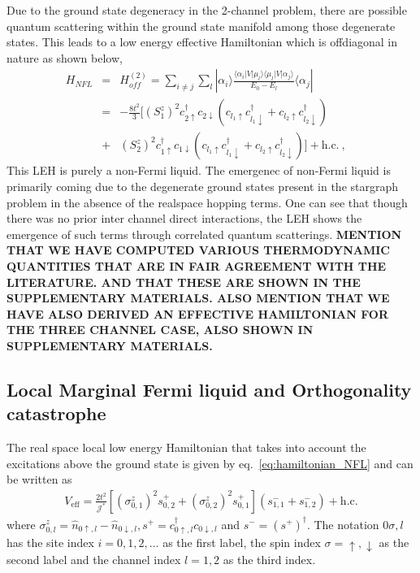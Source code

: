 \documentclass[reprint,prb,superscriptaddress]{revtex4-2}
\begin{document}
Due to the ground state degeneracy in the 2-channel problem, there are possible quantum scattering within the ground state manifold among those degenerate states. This leads to a low energy effective Hamiltonian which is offdiagonal in nature as shown below,
\begin{eqnarray}
H_{NFL}&=&H^{(2)}_{off} = \sum_{i\neq j} \sum_l |\alpha_i\rangle \frac{\langle \alpha_i  | V| \mu_l \rangle \langle \mu_l  | V| \alpha_j \rangle}{E_0-E_{l}}\langle \alpha_j | \nonumber\\
&=& -\frac{8t^2}{3} [ (S_1^z)^2 c_{2\uparrow}^{\dagger}c_{2\downarrow}  (  c_{l_1\uparrow}c_{l_1\downarrow}^{\dagger} +  c_{l_2\uparrow}c_{l_2\downarrow}^{\dagger}  ) \nonumber\\
&+& (S_2^z)^2 c_{1\uparrow}^{\dagger}c_{1\downarrow}  (  c_{l_1\uparrow}c_{l_1\downarrow}^{\dagger} +  c_{l_2\uparrow}c_{l_2\downarrow}^{\dagger}  ) ] + \textrm{h.c.} ~,~~~~
\label{eq:hamiltonian_NFL}
\end{eqnarray}
This LEH is purely a non-Fermi liquid. The emergenec of non-Fermi liquid is primarily coming due to the degenerate ground states present in the stargraph problem in the absence of the realspace hopping terms. One can see that though there was no prior inter channel direct interactions, the LEH shows the emergence of such terms through correlated quantum scatterings. \textbf{MENTION THAT WE HAVE COMPUTED VARIOUS THERMODYNAMIC QUANTITIES THAT ARE IN FAIR AGREEMENT WITH THE LITERATURE. AND THAT THESE ARE SHOWN IN THE SUPPLEMENTARY MATERIALS. ALSO MENTION THAT WE HAVE ALSO DERIVED AN EFFECTIVE HAMILTONIAN FOR THE THREE CHANNEL CASE, ALSO SHOWN IN SUPPLEMENTARY MATERIALS.}


\subsection{Local Marginal Fermi liquid and Orthogonality catastrophe}
The real space local low energy Hamiltonian that takes into account the excitations above the ground state is given by eq.~\ref{eq:hamiltonian_NFL} and can be written as
\begin{equation}\begin{aligned}
	\label{nfl_terms}
	V_\text{eff} = \frac{2t^2}{{\mathcal{J}^*}}\left[\left(\sigma^z_{0,1}\right)^2 s^+_{0,2} + \left(\sigma^z_{0,2}\right)^2 s^+_{0,1}\right] \left(s^-_{1,1} + s^-_{1,2}\right) + \text{h.c.}
\end{aligned}\end{equation}
where \(\sigma^z_{0,l} = \hat n_{0\uparrow,l} - \hat n_{0\downarrow,l}, s^+ = c^\dagger_{0 \uparrow,l}c_{0 \downarrow,l}\) and \(s^- = \left(s^+\right)^\dagger\). The notation \(0\sigma,l\) has the site index \(i=0,1,2,\ldots\) as the first label, the spin index \(\sigma=\uparrow,\downarrow\) as the second label and the channel index \(l=1,2\) as the third index.
\end{document}

